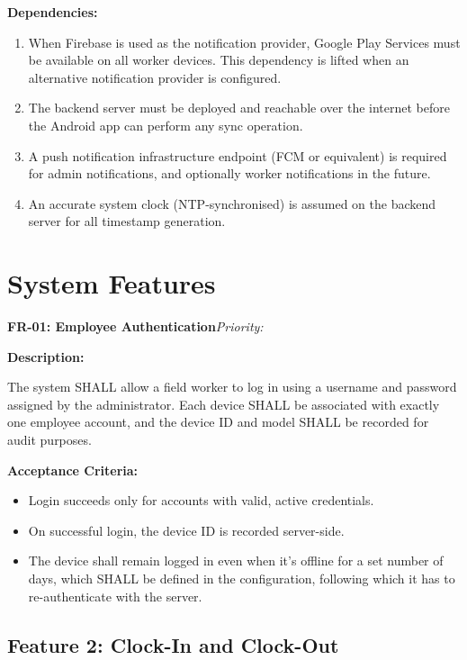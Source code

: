 \documentclass[12pt, a4paper]{article}
\newcommand{\frblock}[2]{%
    \noindent\textbf{#1}\hfill\textit{Priority: #2}%
    \par\smallskip%
}
\newcommand{\srsfield}[1]{\noindent\textbf{#1:}\par}
\begin{document}
\textbf{Dependencies:}
\begin{enumerate}
    \item When Firebase is used as the notification provider, Google Play
          Services must be available on all worker devices. This dependency
          is lifted when an alternative notification provider is configured.
    \item The backend server must be deployed and reachable over the
          internet before the Android app can perform any sync operation.
    \item A push notification infrastructure endpoint (FCM or equivalent)
          is required for admin notifications, and optionally worker notifications in the future.
    \item An accurate system clock (NTP-synchronised) is assumed on the
          backend server for all timestamp generation.
\end{enumerate}

\section{System Features}
\label{sec:features}

\frblock{FR-01: Employee Authentication}{}

\srsfield{Description}
The system SHALL allow a field worker to log in using a username and
password assigned by the administrator. Each device SHALL be associated
with exactly one employee account, and the device ID and model SHALL be
recorded for audit purposes.

\srsfield{Acceptance Criteria}
\begin{itemize}
    \item Login succeeds only for accounts with valid, active credentials.
    \item On successful login, the device ID is recorded server-side.
    \item The device shall remain logged in even when it's offline for a set number of days, which SHALL be defined in the configuration, following which it has to re-authenticate with the server.
\end{itemize}

\subsection{Feature 2: Clock-In and Clock-Out}
\end{document}
